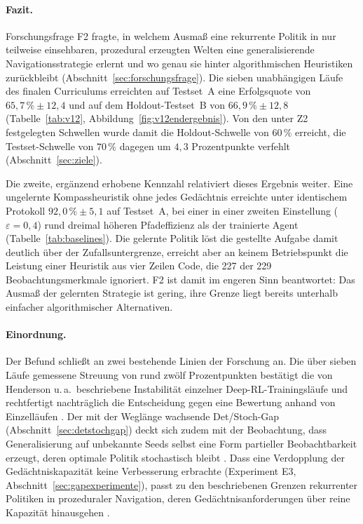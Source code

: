\documentclass[11pt,a4paper]{article}
\begin{document}
\paragraph{Fazit.}
Forschungsfrage F2 fragte, in welchem Ausmaß eine rekurrente Politik in nur
teilweise einsehbaren, prozedural erzeugten Welten eine generalisierende
Navigationsstrategie erlernt und wo genau sie hinter algorithmischen
Heuristiken zurückbleibt (Abschnitt~\ref{sec:forschungsfrage}). Die sieben
unabhängigen Läufe des finalen Curriculums erreichten auf Testset~A eine
Erfolgsquote von $65{,}7\,\% \pm 12{,}4$ und auf dem Holdout-Testset~B von
$66{,}9\,\% \pm 12{,}8$ (Tabelle~\ref{tab:v12}, Abbildung~\ref{fig:v12endergebnis}).
Von den unter Z2 festgelegten Schwellen wurde damit die Holdout-Schwelle von
$60\,\%$ erreicht, die Testset-Schwelle von $70\,\%$ dagegen um $4{,}3$
Prozentpunkte verfehlt (Abschnitt~\ref{sec:ziele}).

Die zweite, ergänzend erhobene Kennzahl relativiert dieses Ergebnis weiter.
Eine ungelernte Kompassheuristik ohne jedes Gedächtnis erreichte unter
identischem Protokoll $92{,}0\,\% \pm 5{,}1$ auf Testset~A, bei einer in
einer zweiten Einstellung ($\varepsilon = 0{,}4$) rund dreimal höheren
Pfadeffizienz als der trainierte Agent (Tabelle~\ref{tab:baselines}). Die
gelernte Politik löst die gestellte Aufgabe damit deutlich über der
Zufallsuntergrenze, erreicht aber an keinem Betriebspunkt die Leistung einer
Heuristik aus vier Zeilen Code, die 227 der 229 Beobachtungsmerkmale
ignoriert. F2 ist damit im engeren Sinn beantwortet: Das Ausmaß der
gelernten Strategie ist gering, ihre Grenze liegt bereits unterhalb
einfacher algorithmischer Alternativen.

\paragraph{Einordnung.}
Der Befund schließt an zwei bestehende Linien der Forschung an. Die über
sieben Läufe gemessene Streuung von rund zwölf Prozentpunkten bestätigt die
von Henderson u.\,a.\ beschriebene Instabilität einzelner
Deep-RL-Trainingsläufe und rechtfertigt nachträglich die Entscheidung gegen
eine Bewertung anhand von Einzelläufen \cite{henderson2018matters}. Der mit
der Weglänge wachsende Det/Stoch-Gap (Abschnitt~\ref{sec:detstochgap}) deckt
sich zudem mit der Beobachtung, dass Generalisierung auf unbekannte Seeds
selbst eine Form partieller Beobachtbarkeit erzeugt, deren optimale Politik
stochastisch bleibt \cite{ghosh2021epistemic}. Dass eine Verdopplung der
Gedächtniskapazität keine Verbesserung erbrachte (Experiment E3,
Abschnitt~\ref{sec:gapexperimente}), passt zu den beschriebenen Grenzen
rekurrenter Politiken in prozeduraler Navigation, deren
Gedächtnisanforderungen über reine Kapazität hinausgehen
\cite{pleines2022recurrent}.
\end{document}
